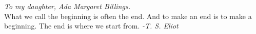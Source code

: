 \chapter*{}
\begin{center}
{\centering \it To my daughter, Ada Margaret Billings.}\\
\hfill \break
{\centering What we call the beginning is often the end. And to make an end is
to make a beginning. The end is where we start from. \it -T. S. Eliot}
\end{center} 